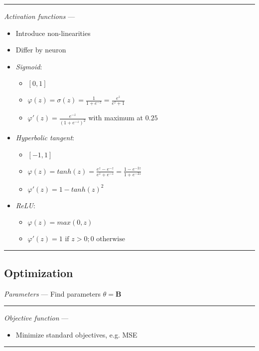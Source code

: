 {\color{lightgray}\hrule height 0.001mm}

\emph{Activation functions} --- 
\begin{itemize}
    \item Introduce non-linearities
    \item Differ by neuron
    \item \emph{Sigmoid}:
    \begin{itemize}
        \item $[0,1]$
        \item $\varphi(z) = \sigma(z) =  \frac{1}{1+e^{-z}} = \frac{e^z}{e^z + 1}$
        \item $\varphi'(z) = \frac{e^{-z}}{(1+e^{-z})^2}$ with maximum at $0.25$
    \end{itemize}
    \item \emph{Hyperbolic tangent}:
    \begin{itemize}
        \item $[-1,1]$
        \item $\varphi(z) = tanh(z) =  \frac{e^z - e^{-z}}{e^z + e^{-z}} = \frac{1 - e^{-2z}}{1 + e^{-2z}}$
        \item $\varphi'(z) = 1-tanh(z)^2$
    \end{itemize}
    \item \emph{ReLU}:
    \begin{itemize}
        \item $\varphi(z) = max(0,z)$
        \item $\varphi'(z) = 1 \textrm{ if } z > 0; 0 \textrm { otherwise}$
    \end{itemize}
\end{itemize}

{\color{black}\hrule height 0.001mm}

\subsection*{Optimization}
\emph{Parameters} --- Find parameters $\theta = \boldsymbol{B}$

{\color{lightgray}\hrule height 0.001mm}

\emph{Objective function} --- 
\begin{itemize}
    \item Minimize standard objectives, e.g. MSE
\end{itemize}

{\color{lightgray}\hrule height 0.001mm}

